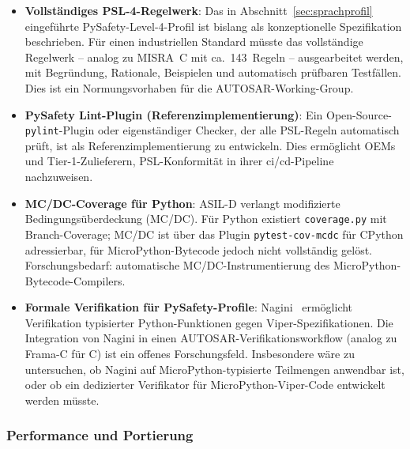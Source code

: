 ﻿\documentclass[12pt,a4paper,twoside]{article}
\begin{document}
\begin{itemize}
  \item \textbf{Vollständiges PSL-4-Regelwerk}:
        Das in Abschnitt~\ref{sec:sprachprofil} eingeführte PySafety-Level-4-Profil
        ist bislang als konzeptionelle Spezifikation beschrieben.
        Für einen industriellen Standard müsste das vollständige Regelwerk
        -- analog zu MISRA~C mit ca.\ 143~Regeln -- ausgearbeitet werden,
        mit Begründung, Rationale, Beispielen und automatisch prüfbaren
        Testfällen. Dies ist ein Normungsvorhaben für die AUTOSAR-Working-Group.

  \item \textbf{PySafety Lint-Plugin (Referenzimplementierung)}:
        Ein Open-Source-\texttt{pylint}-Plugin oder eigenständiger Checker,
        der alle PSL-Regeln automatisch prüft, ist als Referenzimplementierung
        zu entwickeln. Dies ermöglicht OEMs und Tier-1-Zulieferern, PSL-Konformität
        in ihrer \gls{ci}/\gls{cd}-Pipeline nachzuweisen.

  \item \textbf{MC/DC-Coverage für Python}:
        ASIL-D verlangt modifizierte Bedingungsüberdeckung (MC/DC).
        Für Python existiert \texttt{coverage.py} mit Branch-Coverage; MC/DC ist
        über das Plugin \texttt{pytest-cov-mcdc} für CPython adressierbar, für
        MicroPython-Bytecode jedoch nicht vollständig gelöst.
        Forschungsbedarf: automatische MC/DC-Instrumentierung des
        MicroPython-Bytecode-Compilers.

  \item \textbf{Formale Verifikation für PySafety-Profile}:
        Nagini~\cite{nagini2018} ermöglicht Verifikation typisierter Python-Funktionen
        gegen Viper-Spezifikationen.
        Die Integration von Nagini in einen AUTOSAR-Verifikationsworkflow
        (analog zu Frama-C für C) ist ein offenes Forschungsfeld.
        Insbesondere wäre zu untersuchen, ob Nagini auf MicroPython-typisierte
        Teilmengen anwendbar ist, oder ob ein dedizierter Verifikator für
        MicroPython-Viper-Code entwickelt werden müsste.
\end{itemize}

\subsubsection{Performance und Portierung}
\end{document}
